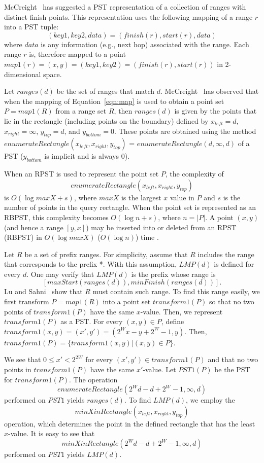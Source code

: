 McCreight~\cite{mc} has suggested a PST representation of a collection of ranges
with distinct finish points. This representation uses the following mapping of
a range $r$ into a PST tuple:
\begin{equation}\label{eqn:map}
(key1, key2, data) = (finish(r), start(r), data)
\end{equation}
where $data$ is any information (e.g., next hop) associated with the range.
Each range $r$ is, therefore mapped to a point $map1(r) = (x,y) = (key1, key2) =
(finish(r), start(r))$ in 2-dimensional space.


Let $ranges(d)$ be the set of ranges that match $d$.
McCreight~\cite{mc} has observed that when the mapping of Equation~\ref{eqn:map}
is used to obtain a point set $P = map1(R)$ from a range set $R$, then
$ranges(d)$ is given by the points that lie in
the rectangle
(including points on the
boundary)
defined by
$x_{left} = d$, $x_{right} = \infty$, $y_{top} = d$, and $y_{bottom}
= 0$. These points are obtained using the method
$enumerateRectangle(x_{left}, x_{right}, y_{top})$ =
$enumerateRectangle(d, \infty, d)$ of a PST ($y_{bottom}$ is implicit
and is always $0$).

When an RPST is used to represent the point set $P$, the complexity
of
$$enumerateRectangle(x_{left}, x_{right}, y_{top})$$
is $O(\log maxX + s)$,
where $maxX$ is the largest $x$ value in $P$ and $s$ is the number
of points in the query rectangle. When the point set is represented as an
RBPST, this complexity becomes $O(\log n + s)$, where $n = |P|$.
A point $(x,y)$ (and hence a range $[y,x]$) may be inserted into or deleted
from an RPST (RBPST) in $O(\log maxX)$ ($O(\log n)$) time \cite{mc}.

Let $R$ be a set of prefix ranges.
For simplicity, assume that
$R$ includes the range that corresponds to the prefix *.
With this assumption, $LMP(d)$ is defined for every $d$.
One may verify
that
$LMP(d)$ is the prefix whose range is
$$[maxStart(ranges(d)),minFinish(ranges(d))].$$
Lu and Sahni~\cite{lu}
show that $R$ must contain such  range.
To find this range easily, we first transform $P = map1(R)$ into a point set
$transform1(P)$ so that no two points of $transform1(P)$ have the
same $x$-value. Then, we represent $transform1(P)$ as a PST.
For every $(x,y) \in P$, define
$transform1(x,y) = (x',y') = (2^W x - y + 2^W - 1,y)$.
Then,
$transform1(P) = \{transform1(x,y) | (x,y) \in P\}$.


We see that $0 \leq x' < 2^{2W}$ for every $(x',y') \in transform1(P)$
and that no two points in $transform1(P)$ have the same $x'$-value.
Let $PST1(P)$ be the PST for $transform1(P)$. The operation
$$enumerateRectangle(2^W d - d + 2^W - 1, \infty, d)$$
performed on
$PST1$ yields $ranges(d)$. To find $LMP(d)$, we employ the
$$minXinRectangle(x_{left}, x_{right}, y_{top})$$
operation, which
determines the point in the defined rectangle that has the least $x$-value.
It is easy to see that
$$minXinRectangle(2^Wd - d + 2^W - 1, \infty, d)$$
performed on $PST1$ yields $LMP(d)$.

